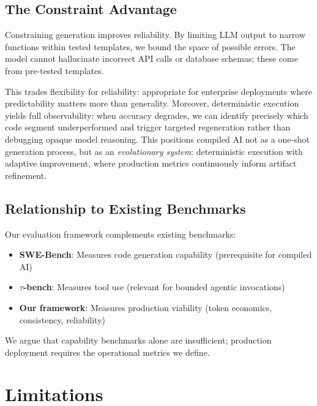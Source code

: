 \documentclass[11pt]{article}
\begin{document}
\subsection{The Constraint Advantage}

Constraining generation improves reliability. By limiting LLM output to narrow functions within tested templates, we bound the space of possible errors. The model cannot hallucinate incorrect API calls or database schemas; these come from pre-tested templates.

This trades flexibility for reliability: appropriate for enterprise deployments where predictability matters more than generality. Moreover, deterministic execution yields full observability: when accuracy degrades, we can identify precisely which code segment underperformed and trigger targeted regeneration rather than debugging opaque model reasoning. This positions compiled AI not as a one-shot generation process, but as an \emph{evolutionary system}: deterministic execution with adaptive improvement, where production metrics continuously inform artifact refinement.

\subsection{Relationship to Existing Benchmarks}

Our evaluation framework complements existing benchmarks:
\begin{itemize}
    \item \textbf{SWE-Bench}: Measures code generation capability (prerequisite for compiled AI)
    \item \textbf{$\tau$-bench}: Measures tool use (relevant for bounded agentic invocations)
    \item \textbf{Our framework}: Measures production viability (token economics, consistency, reliability)
\end{itemize}

We argue that capability benchmarks alone are insufficient; production deployment requires the operational metrics we define.

\section{Limitations}
\label{sec:limitations}
\end{document}
